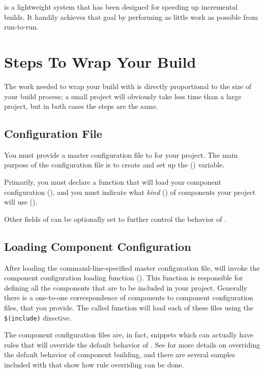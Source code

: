 \lmsbw is a lightweight system that has been designed for speeding up
incremental builds.  It handily achieves that goal by performing as
little work as possible from run-to-run.

\section{Steps To Wrap Your Build}

The work needed to wrap your build with \lmsbw is directly
proportional to the size of your build process; a small project will
obviously take less time than a large project, but in both cases the
steps are the same.

\subsection{Configuration File}

You must provide a master configuration file to \lmsbw for your
project.  The main purpose of the configuration file is to create and
set up the \lmsbwconfiguration ()
variable.

Primarily, you must declare a \gnumake function that will load your
component configuration (), and
you must indicate what \emph{kind} () of
components your project will use
().

Other fields of \lmsbwconfiguration can be optionally set to further
control the behavior of \lmsbw.

\subsection{Loading Component Configuration}

After loading the command-line-specified master configuration file,
\lmsbw will invoke the component configuration loading function
().  This function is responsible
for defining all the components that are to be included in your
project.  Generally there is a one-to-one correspondence of components
to component configuration files, that you provide.  The called
function will load each of these files using the \gnumake
\texttt{\$(include)} directive.

The component configuration files are, in fact, \makefile snippets
which can actually have rules that will override the default behavior
of \lmsbw.  See  for more details on overriding
the default behavior of component building, and there are several
samples included with \lmsbw that show how rule overriding can be
done.

